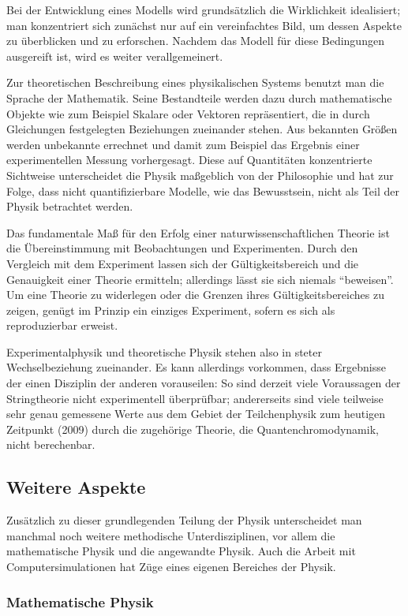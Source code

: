 \documentclass[titlepage, parkskip=full, twocolumn, landscape]{scrartcl}
\begin{document}
Bei der Entwicklung eines Modells wird grundsätzlich die Wirklichkeit idealisiert; man konzentriert sich zunächst nur auf ein vereinfachtes Bild, um dessen Aspekte zu überblicken und zu erforschen. Nachdem das Modell für diese Bedingungen ausgereift ist, wird es weiter verallgemeinert.

Zur theoretischen Beschreibung eines physikalischen Systems benutzt man die Sprache der Mathematik. Seine Bestandteile werden dazu durch mathematische Objekte wie zum Beispiel Skalare oder Vektoren repräsentiert, die in durch Gleichungen festgelegten Beziehungen zueinander stehen. Aus bekannten Größen werden unbekannte errechnet und damit zum Beispiel das Ergebnis einer experimentellen Messung vorhergesagt. Diese auf Quantitäten konzentrierte Sichtweise unterscheidet die Physik maßgeblich von der Philosophie und hat zur Folge, dass nicht quantifizierbare Modelle, wie das Bewusstsein, nicht als Teil der Physik betrachtet werden.

Das fundamentale Maß für den Erfolg einer naturwissenschaftlichen Theorie ist die Übereinstimmung mit Beobachtungen und Experimenten. Durch den Vergleich mit dem Experiment lassen sich der Gültigkeitsbereich und die Genauigkeit einer Theorie ermitteln; allerdings lässt sie sich niemals "`beweisen"'. Um eine Theorie zu widerlegen oder die Grenzen ihres Gültigkeitsbereiches zu zeigen, genügt im Prinzip ein einziges Experiment, sofern es sich als reproduzierbar erweist.

Experimentalphysik und theoretische Physik stehen also in steter Wechselbeziehung zueinander. Es kann allerdings vorkommen, dass Ergebnisse der einen Disziplin der anderen vorauseilen: So sind derzeit viele Voraussagen der Stringtheorie nicht experimentell überprüfbar; andererseits sind viele teilweise sehr genau gemessene Werte aus dem Gebiet der Teilchenphysik zum heutigen Zeitpunkt (2009) durch die zugehörige Theorie, die Quantenchromodynamik, nicht berechenbar.

\subsection{Weitere Aspekte}

Zusätzlich zu dieser grundlegenden Teilung der Physik unterscheidet man manchmal noch weitere methodische Unterdisziplinen, vor allem die mathematische Physik und die angewandte Physik. Auch die Arbeit mit Computersimulationen hat Züge eines eigenen Bereiches der Physik.

\subsubsection{Mathematische Physik}
\end{document}
